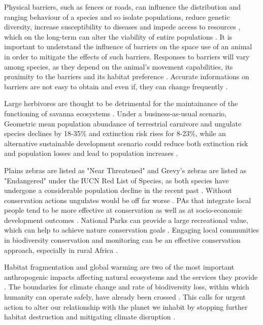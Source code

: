 \documentclass[12pt,a4paper, twoside, english]{article}
\begin{document}
Physical barriers, such as fences or roads, can influence the distribution and ranging behaviour of a species and so isolate populations, reduce genetic diversity, increase susceptibility to diseases and impede access to resources \citep{Bliss-Ketchum2016}, which on the long-term can alter the viability of entire populations \citep{Cozzi2013}. It is important to understand the influence of barriers on the space use of an animal in order to mitigate the effects of such barriers. Responses to barriers will vary among species, as they depend on the animal's movement capabilities, its proximity to the barriers and its habitat preference \citep{Beyer2016}. Accurate informations on barriers are not easy to obtain and even if, they can change frequently \citep{Neumann2015a}.


Large herbivores are thought to be detrimental for the maintainance of the functioning of savanna ecosystems \citep{Goheen2010}. Under a business-as-usual scenario, Geometric mean population abundance of terrestrial carnivore and ungulate species declines by 18-35\% and extinction risk rises for 8-23\%, while an alternative sustainable development scenario could reduce both extinction risk and population losses and lead to population increases \citep{Visconti2015}.

Plains zebras are listed as "Near Threatened" and Grevy's zebras are listed as "Endangered" under the IUCN Red List of Species, as both species have undergone a considerable population decline in the recent past \citep{Moehlman2013, King2016}. Without conservation actions ungulates would be off far worse \citep{Hoffmann2015}. PAs that integrate local people tend to be more effective at conservation as well as at socio-economic development outcomes \citep{Oldekop2015}. National Parks can provide a large recreational value, which can help to achieve nature conservation goals \citep{Schagner2016}. Engaging local communities in biodiversity conservation and monitoring can be an effective conservation approach, especially in rural Africa \citep{Dolrenry2016}.


Habitat fragmentation and global warming are two of the most important anthropogenic impacts affecting natural ecosystems and the services they provide \citep{Barnes2015}. The boundaries for climate change and rate of biodiversity loss, within which humanity can operate safely, have already been crossed \citep{Rockstroem2009}. This calls for urgent action to alter our relationship with the planet we inhabit by stopping further habitat destruction and mitigating climate disruption \citep{Young2016a, Steffen2011}.
\end{document}
